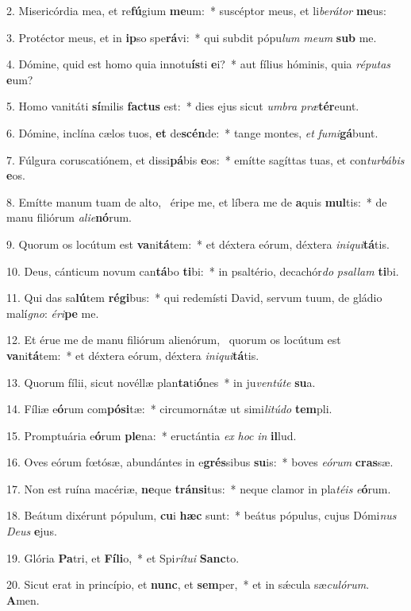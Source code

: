 2. Misericórdia mea, et re\textbf{fú}gium \textbf{me}um:~*  suscéptor meus, et li\textit{be}\textit{rá}\textit{tor} \textbf{me}us:\

3. Protéctor meus, et in \textbf{ip}so spe\textbf{rá}vi:~*  qui subdit pópu\textit{lum} \textit{me}\textit{um} \textbf{sub} me.\

4. Dómine, quid est homo quia innotu\textbf{ís}ti \textbf{e}i?~*  aut fílius hóminis, quia \textit{ré}\textit{pu}\textit{tas} \textbf{e}um?\

5. Homo vanitáti \textbf{sí}milis \textbf{fac}\textbf{tus} est:~*  dies ejus sicut \textit{um}\textit{bra} \textit{præ}\textbf{tér}eunt.\

6. Dómine, inclína cælos tuos, \textbf{et} de\textbf{scén}de:~*  tange montes, \textit{et} \textit{fu}\textit{mi}\textbf{gá}bunt.\

7. Fúlgura coruscatiónem, et dissi\textbf{pá}bis \textbf{e}os:~*  emítte sagíttas tuas, et con\textit{tur}\textit{bá}\textit{bis} \textbf{e}os.\

8. Emítte manum tuam de alto, \dag\  éripe me, et líbera me de \textbf{a}quis \textbf{mul}tis:~*  de manu filiórum \textit{a}\textit{li}\textit{e}\textbf{nó}rum.\

9. Quorum os locútum est \textbf{va}ni\textbf{tá}tem:~*  et déxtera eórum, déxtera \textit{in}\textit{i}\textit{qui}\textbf{tá}tis.\

10. Deus, cánticum novum can\textbf{tá}bo \textbf{ti}bi:~*  in psaltério, decachór\textit{do} \textit{psal}\textit{lam} \textbf{ti}bi.\

11. Qui das sa\textbf{lú}tem \textbf{ré}\textbf{gi}bus:~*  qui redemísti David, servum tuum, de gládio malí\textit{gno}: \textit{é}\textit{ri}\textbf{pe} me.\

12. Et érue me de manu filiórum alienórum, \dag\  quorum os locútum est \textbf{va}ni\textbf{tá}tem:~*  et déxtera eórum, déxtera \textit{in}\textit{i}\textit{qui}\textbf{tá}tis.\

13. Quorum fílii, sicut novéllæ plan\textbf{ta}ti\textbf{ó}nes~*  in ju\textit{ven}\textit{tú}\textit{te} \textbf{su}a.\

14. Fíliæ e\textbf{ó}rum com\textbf{pó}\textbf{si}tæ:~*  circumornátæ ut simi\textit{li}\textit{tú}\textit{do} \textbf{tem}pli.\

15. Promptuária e\textbf{ó}rum \textbf{ple}na:~*  eructántia \textit{ex} \textit{hoc} \textit{in} \textbf{il}lud.\

16. Oves eórum fœtósæ, abundántes in e\textbf{grés}sibus \textbf{su}is:~*  boves \textit{e}\textit{ó}\textit{rum} \textbf{cras}sæ.\

17. Non est ruína macériæ, \textbf{ne}que \textbf{tráns}\textbf{i}tus:~*  neque clamor in pla\textit{té}\textit{is} \textit{e}\textbf{ó}rum.\

18. Beátum dixérunt pópulum, \textbf{cu}i \textbf{hæc} sunt:~*  beátus pópulus, cujus Dómi\textit{nus} \textit{De}\textit{us} \textbf{e}jus.\

19. Glória \textbf{Pa}tri, et \textbf{Fí}\textbf{li}o,~*  et Spi\textit{rí}\textit{tu}\textit{i} \textbf{Sanc}to.\

20. Sicut erat in princípio, et \textbf{nunc}, et \textbf{sem}per,~*  et in sǽcula sæ\textit{cu}\textit{ló}\textit{rum}. \textbf{A}men.\

